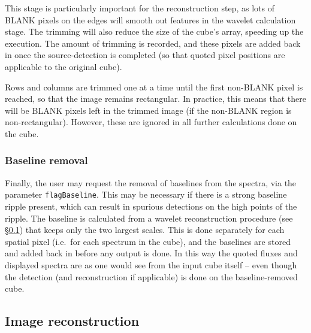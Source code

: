 \documentclass[12pt,a4paper]{article}
\newcommand{\ie}{i.e.\ }
\begin{document}
This stage is particularly important for the reconstruction step, as
lots of BLANK pixels on the edges will smooth out features in the
wavelet calculation stage. The trimming will also reduce the size of
the cube's array, speeding up the execution. The amount of trimming is
recorded, and these pixels are added back in once the source-detection
is completed (so that quoted pixel positions are applicable to the
original cube).

Rows and columns are trimmed one at a time until the first non-BLANK
pixel is reached, so that the image remains rectangular. In practice,
this means that there will be BLANK pixels left in the trimmed image
(if the non-BLANK region is non-rectangular). However, these are
ignored in all further calculations done on the cube.

\subsubsection{Baseline removal}

Finally, the user may request the removal of baselines from the
spectra, via the parameter {\tt flagBaseline}. This may be necessary
if there is a strong baseline ripple present, which can result in
spurious detections on the high points of the ripple. The baseline is
calculated from a wavelet reconstruction procedure (see
\S\ref{sec-recon}) that keeps only the two largest scales. This is
done separately for each spatial pixel (\ie for each spectrum in the
cube), and the baselines are stored and added back in before any
output is done. In this way the quoted fluxes and displayed spectra
are as one would see from the input cube itself -- even though the
detection (and reconstruction if applicable) is done on the
baseline-removed cube.

\subsection{Image reconstruction}
\label{sec-recon}
\end{document}
